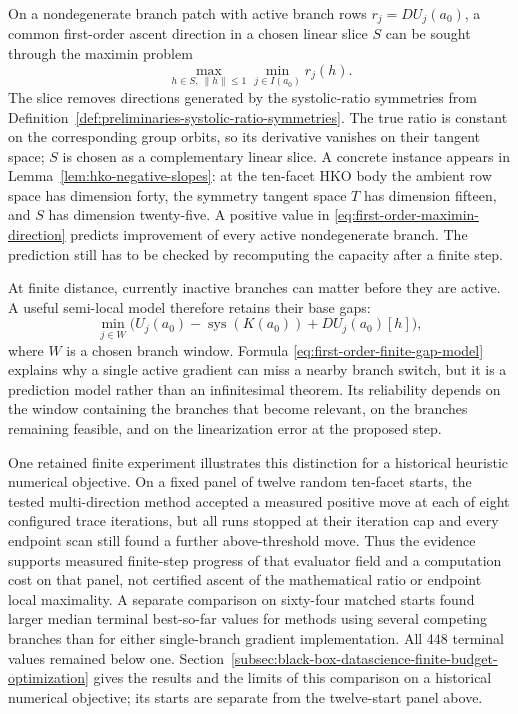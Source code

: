 On a nondegenerate branch patch with active branch rows
\(r_j=DU_j(a_0)\), a common first-order ascent direction in a chosen linear
slice \(S\) can be sought through the maximin problem
\begin{equation}\label{eq:first-order-maximin-direction}
  \max_{h\in S,\ \lVert h\rVert\leq1}
  \min_{j\in I(a_0)} r_j(h).
\end{equation}
The slice removes directions generated by the systolic-ratio symmetries from
Definition~\ref{def:preliminaries-systolic-ratio-symmetries}.  The true ratio
is constant on the corresponding group orbits, so its derivative vanishes on
their tangent space; \(S\) is chosen as a complementary linear slice.  A
concrete instance appears in Lemma~\ref{lem:hko-negative-slopes}: at the
ten-facet HKO body the ambient row space has dimension forty, the symmetry
tangent space $T$ has dimension fifteen, and $S$ has dimension twenty-five.
A positive value in
\eqref{eq:first-order-maximin-direction} predicts improvement of every active
nondegenerate branch.  The prediction still has to be checked by recomputing the
capacity after a finite step.

At finite distance, currently inactive branches can matter before they are
active.  A useful semi-local model therefore retains their base gaps:
\begin{equation}\label{eq:first-order-finite-gap-model}
  \min_{j\in W}
  \bigl(
    U_j(a_0)-\operatorname{sys}(K(a_0))+DU_j(a_0)[h]
  \bigr),
\end{equation}
where \(W\) is a chosen branch window.  Formula
\eqref{eq:first-order-finite-gap-model} explains why a single active gradient
can miss a nearby branch switch, but it is a prediction model rather than an
infinitesimal theorem.  Its reliability depends on the window containing the
branches that become relevant, on the branches remaining feasible, and on the
linearization error at the proposed step.

One retained finite experiment illustrates this distinction for a historical
heuristic numerical objective. On a fixed
panel of twelve random ten-facet starts, the tested multi-direction
method accepted a measured positive move at each of eight configured trace iterations,
but all runs stopped at their iteration cap and every endpoint scan still
found a further above-threshold move.  Thus the evidence supports measured finite-step
progress of that evaluator field and a computation cost on that panel, not
certified ascent of the mathematical ratio or endpoint local maximality.  A separate comparison on sixty-four matched starts found larger median
terminal best-so-far values for methods using several competing branches
than for either single-branch gradient implementation. All 448 terminal
values remained below one. Section~\ref{subsec:black-box-datascience-finite-budget-optimization}
gives the results and the limits of this comparison on a historical numerical
objective; its starts are separate from the twelve-start panel above.

